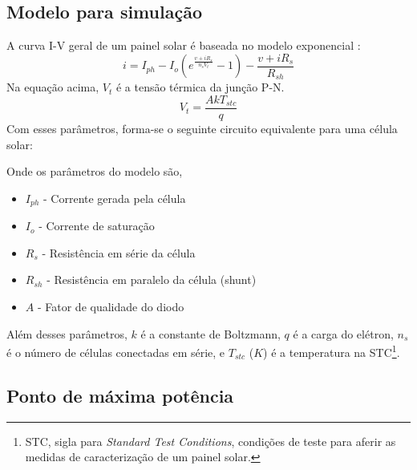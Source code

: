 \subsection{Modelo para simulação}
A curva I-V geral de um painel solar é baseada no modelo exponencial \cite{pv_datasheet}:
\begin{equation}
    i = I_{ph} - I_{o}(e^{\frac{v + iR_{s}}{n_{s}V_{t}}}-1) - \frac{v + iR_{s}}{R_{sh}}
\end{equation}
Na equação acima, $V_{t}$ é a tensão térmica da junção P-N.
\begin{equation}
    V_{t} = \frac{AkT_{stc}}{q}
\end{equation}
Com esses parâmetros, forma-se o seguinte circuito equivalente para uma célula solar:
\noindent
\begin{minipage}{\linewidth}
\label{PV_equivalent_circuit_fig}
\end{minipage}
Onde os parâmetros do modelo são,
\begin{itemize}
    \item $I_{ph}$ - Corrente gerada pela célula
    \item $I_{o}$ - Corrente de saturação
    \item $R_{s}$ - Resistência em série da célula
    \item $R_{sh}$ - Resistência em paralelo da célula (shunt)
    \item $A$ - Fator de qualidade do diodo
\end{itemize}
Além desses parâmetros, $k$ é a constante de Boltzmann, $q$ é a carga do elétron, $n_{s}$ é o número de células conectadas em série, e $T_{stc}$ ($K$) é a temperatura na STC\footnote{STC, sigla para \textit{Standard Test Conditions}, condições de teste para aferir as medidas de caracterização de um painel solar.}.
\subsection{Ponto de máxima potência}

